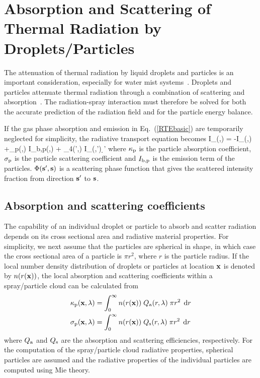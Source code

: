 \section{Absorption and Scattering of Thermal Radiation by Droplets/Particles}
\label{droplet-radiation}

The attenuation of thermal radiation by liquid droplets and particles is an important consideration, especially for water mist
systems~\cite{Ravigururajan:1}.  Droplets and particles attenuate thermal radiation through a combination of scattering and
absorption~\cite{Tuntomo:1}.  The radiation-spray interaction must therefore be solved for both the accurate prediction of the radiation
field and for the particle energy balance.

If the gas phase absorption and emission in Eq.~(\ref{RTEbasic}) are temporarily neglected for simplicity, the radiative transport
equation becomes
\be
\bs \cdot \nabla I_{\la}(\bx,\bs) = -
I_{\la}(\bx,\bs) +\kappa_{\rm p}(\bx,\la) \; I_{{\rm b,p}}(\bx,\la) +
\int_{4\pi}\Phi(\bs',\bs) \; I_{\la}(\bx,\bs') \; \d\bs'
\label{RTEspray}
\ee
where $\kappa_{\rm p}$ is the particle absorption coefficient, $\sigma_{\rm p}$ is the
particle scattering coefficient and $I_{{\rm b,p}}$ is the emission
term of the particles. $\Phi({\mathbf{s}}',{\mathbf{s}})$ is a scattering phase function
that gives the scattered intensity fraction from direction ${\mathbf{s}}'$ to ${\mathbf{s}}$.\\

\subsection{Absorption and scattering coefficients}

The capability of an individual droplet or particle to absorb and scatter radiation depends on its cross sectional area and radiative material
properties. For simplicity, we next assume that the particles are spherical in shape, in which case the cross sectional area of a particle
is $\pi r^2$, where $r$ is the particle radius. If the local number density distribution of droplets or particles at location ${\mathbf{x}}$ is
denoted by $n(r({\mathbf{x}}))$, the local absorption and scattering coefficients within a spray/particle cloud can be calculated
from
\begin{align}
\kappa_{\rm p}(\bx,\la) &= \int_0^\infty n(r(\bx)) \; Q_{\rm a}(r,\la) \; \pi r^2 \; \d r \\ %
\sigma_{\rm p}(\bx,\la) &= \int_0^\infty n(r(\bx)) \; Q_{\rm s}(r,\la) \; \pi r^2 \; \d r    %
\end{align}
where $Q_{\rm a}$ and $Q_{\rm s}$ are the absorption and scattering efficiencies, respectively.
For the computation of the spray/particle cloud radiative properties,
spherical particles are assumed and the radiative properties of the individual particles
are computed using Mie theory.

